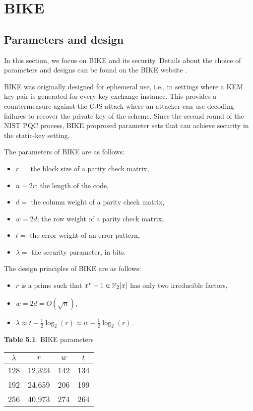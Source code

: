 \chapter{BIKE}

\section{Parameters and design}

In this section, we focus on BIKE and its security. Details about the choice of parameters and designs can be found on the BIKE website \cite{BIKE}.

BIKE was originally designed for ephemeral use, i.e., in settings where a KEM key pair is generated for every key exchange instance. This provides a countermeasure against the GJS attack \cite{GJS16} where an attacker can use decoding failures to recover the private key of the scheme. Since the second round of the NIST PQC process, BIKE proprosed parameter sets that can achieve security in the static-key setting.

The parameters of BIKE are as follows:

\begin{itemize}
\item $r = $ the block size of a parity check matrix,
\item $n = 2r$; the length of the code,
\item $d = $ the column weight of a parity check matrix,
\item $w = 2d$; the row weight of a parity check matrix,
\item $t = $ the error weight of an error pattern,
\item $\lambda = $ the security parameter, in bits.
\end{itemize}

The design principles of BIKE are as follows:

\begin{itemize}
\item $r$ is a prime such that $x^r -1 \in \mathbb{F}_2[x]$ has only two irreducible factors,
\item $w = 2d = O(\sqrt{n})$,
\item $\lambda \approx t - \frac{1}{2}\log_2(r) \approx w - \frac{1}{2}\log_2(r)$.
\end{itemize}

\begin{center}
\textbf{Table 5.1}: BIKE parameters
\end{center}
\begin{table}[h] \label{parametertable}
\centering
\begin{tabular}{cccc}
\hline
$\lambda$ & $r$ & $w$ & $t$ \\ \hline
128 & 12,323 & 142 & 134 \\
192 & 24,659 & 206 & 199 \\
256 & 40,973 & 274 & 264 \\ \hline
\end{tabular}
\end{table}


